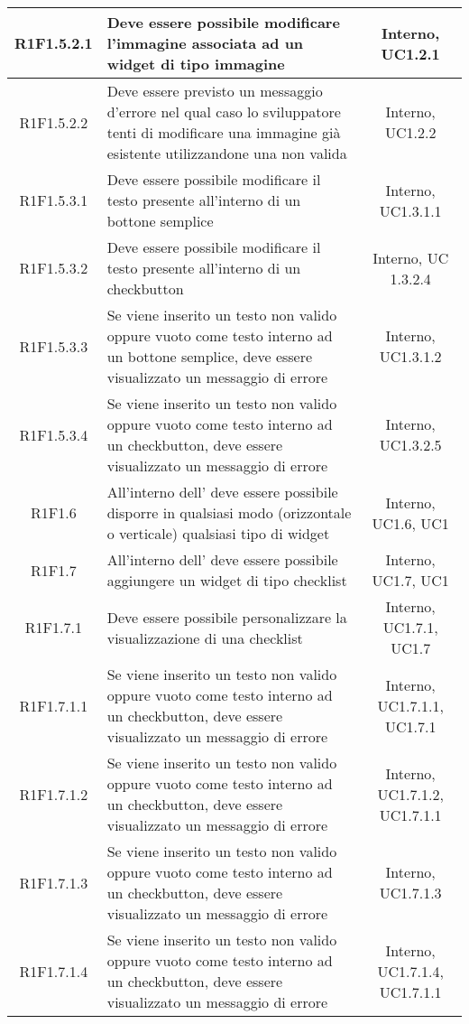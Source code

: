 \begin{longtable}{|c|>{\centering}m{7cm}|c|}
		\hline
		R1F1.5.2.1 & Deve essere possibile modificare l'immagine associata ad un widget di tipo immagine & Interno, UC1.2.1 \\
		\hline
		R1F1.5.2.2 & Deve essere previsto un messaggio d'errore nel qual caso lo sviluppatore tenti di modificare una immagine già esistente utilizzandone una non valida & Interno, UC1.2.2 \\
		\hline
		R1F1.5.3.1 & Deve essere possibile modificare il testo presente all'interno di un bottone semplice & Interno, UC1.3.1.1 \\
		\hline
		R1F1.5.3.2 & Deve essere possibile modificare il testo presente all'interno di un checkbutton & Interno, UC 1.3.2.4 \\
		\hline
		R1F1.5.3.3 & Se viene inserito un testo non valido oppure vuoto come testo interno ad un bottone semplice, deve essere visualizzato un messaggio di errore & Interno, UC1.3.1.2\\
		\hline
		R1F1.5.3.4 & Se viene inserito un testo non valido oppure vuoto come testo interno ad un checkbutton, deve essere visualizzato un messaggio di errore & Interno, UC1.3.2.5\\
		\hline
		R1F1.6 & All'interno dell'\termine{SDK} deve essere possibile disporre in qualsiasi modo (orizzontale o verticale) qualsiasi tipo di widget & Interno, UC1.6, UC1 \\ 
		\hline
		R1F1.7 & All'interno dell'\termine{SDK} deve essere possibile aggiungere un widget di tipo checklist & Interno, UC1.7, UC1 \\
		\hline	
		R1F1.7.1 & Deve essere possibile personalizzare la visualizzazione di una checklist & Interno, UC1.7.1, UC1.7 \\
		\hline
		R1F1.7.1.1 & Se viene inserito un testo non valido oppure vuoto come testo interno ad un checkbutton, deve essere visualizzato un messaggio di errore & Interno, UC1.7.1.1, UC1.7.1 \\
		\hline
		R1F1.7.1.2 & Se viene inserito un testo non valido oppure vuoto come testo interno ad un checkbutton, deve essere visualizzato un messaggio di errore & Interno, UC1.7.1.2, UC1.7.1.1\\
		\hline
		R1F1.7.1.3 & Se viene inserito un testo non valido oppure vuoto come testo interno ad un checkbutton, deve essere visualizzato un messaggio di errore & Interno, UC1.7.1.3\\
		\hline
		R1F1.7.1.4 & Se viene inserito un testo non valido oppure vuoto come testo interno ad un checkbutton, deve essere visualizzato un messaggio di errore & Interno, UC1.7.1.4, UC1.7.1.1 \\

\end{longtable}
